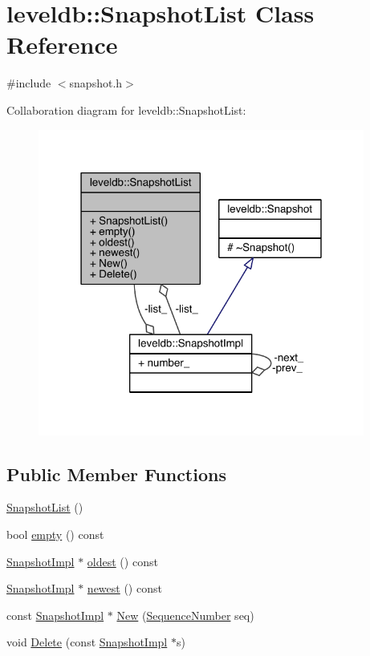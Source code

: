 \hypertarget{classleveldb_1_1_snapshot_list}{}\section{leveldb\+:\+:Snapshot\+List Class Reference}
\label{classleveldb_1_1_snapshot_list}


{\ttfamily \#include $<$snapshot.\+h$>$}



Collaboration diagram for leveldb\+:\+:Snapshot\+List\+:\nopagebreak
\begin{figure}[H]
\begin{center}
\leavevmode
\includegraphics[width=304pt]{classleveldb_1_1_snapshot_list__coll__graph}
\end{center}
\end{figure}
\subsection*{Public Member Functions}
\begin{DoxyCompactItemize}
\item 
\hyperlink{classleveldb_1_1_snapshot_list_a8e312959c2c2e2e64e9bb7eaca2459ae}{Snapshot\+List} ()
\item 
bool \hyperlink{classleveldb_1_1_snapshot_list_a27da501f33ea4aff4bb13c3443f98f70}{empty} () const 
\item 
\hyperlink{classleveldb_1_1_snapshot_impl}{Snapshot\+Impl} $\ast$ \hyperlink{classleveldb_1_1_snapshot_list_ad5990de13c4afa6877f8f3c641d8e72d}{oldest} () const 
\item 
\hyperlink{classleveldb_1_1_snapshot_impl}{Snapshot\+Impl} $\ast$ \hyperlink{classleveldb_1_1_snapshot_list_a783918fabc82113d6ffb014ce67395dc}{newest} () const 
\item 
const \hyperlink{classleveldb_1_1_snapshot_impl}{Snapshot\+Impl} $\ast$ \hyperlink{classleveldb_1_1_snapshot_list_adfd5d9c7cb888e711d83a48299141994}{New} (\hyperlink{namespaceleveldb_a5481ededd221c36d652c371249f869fa}{Sequence\+Number} seq)
\item 
void \hyperlink{classleveldb_1_1_snapshot_list_aa16863f35b8bb6dbc44f4528fab6790a}{Delete} (const \hyperlink{classleveldb_1_1_snapshot_impl}{Snapshot\+Impl} $\ast$s)
\end{DoxyCompactItemize}

